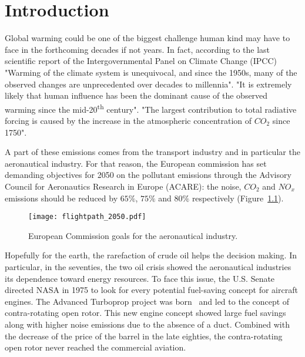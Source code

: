 
\chapter{Introduction}

Global warming could be one of the biggest challenge human kind
may have to face in the forthcoming decades if not years.
In fact, according to the last scientific
report of the Intergovernmental Panel on Climate Change 
(IPCC)~\cite{IPCC2013}
"Warming of the climate system is unequivocal, 
and since the 1950s, many of the observed 
changes are unprecedented over decades to millennia".
"It is extremely likely that human influence has 
been the dominant cause of the 
observed warming since the mid-20\textsuperscript{th} 
century".
"The largest contribution to total radiative 
forcing is caused by the increase in the atmospheric 
concentration of $CO_2$ since 1750".

A part of these emissions comes from the
transport industry and in particular the
aeronautical industry. 
For that reason, the European commission has set
demanding objectives for 2050 on the pollutant emissions
through the
Advisory Council for 
Aeronautics Research in Europe (ACARE):
the noise, $CO_2$ and $NO_x$ emissions should be reduced by 
$65\%$, $75\%$ and $80\%$ respectively
(Figure~\ref{fig:flightpath_2050}).
\begin{figure}[htp]
  \centering
  \texttt{[image: flightpath\_2050.pdf]}
  \caption{European Commission goals for the aeronautical industry.}
  \label{fig:flightpath_2050}
\end{figure}

Hopefully for the earth,
the rarefaction of crude oil helps the decision making.
In particular, in the seventies, the two oil crisis showed the aeronautical 
industries its dependence toward energy resources. 
To face this issue, the U.S. Senate directed NASA in 1975
to look for every potential fuel-saving concept for aircraft
engines. The Advanced Turboprop
project was born~\cite{Hager1988} and led to the
concept of contra-rotating open rotor. This new
engine concept showed large fuel savings
along with higher noise emissions due to the absence of
a duct. Combined with the decrease of the price of the
barrel in the late eighties, the contra-rotating open rotor 
never reached the commercial aviation.

